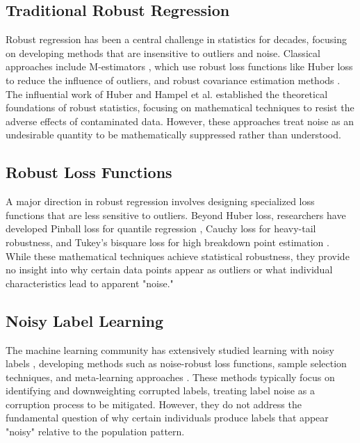 \documentclass[conference]{IEEEtran}
\begin{document}
\subsection{Traditional Robust Regression}
Robust regression has been a central challenge in statistics for decades, focusing on developing methods that are insensitive to outliers and noise. Classical approaches include M-estimators \cite{huber1964robust}, which use robust loss functions like Huber loss to reduce the influence of outliers, and robust covariance estimation methods \cite{rousseeuw1987robust}. The influential work of Huber \cite{huber2009robust} and Hampel et al. \cite{hampel1986robust} established the theoretical foundations of robust statistics, focusing on mathematical techniques to resist the adverse effects of contaminated data. However, these approaches treat noise as an undesirable quantity to be mathematically suppressed rather than understood.

\subsection{Robust Loss Functions}
A major direction in robust regression involves designing specialized loss functions that are less sensitive to outliers. Beyond Huber loss, researchers have developed Pinball loss for quantile regression \cite{koenker1978regression}, Cauchy loss for heavy-tail robustness, and Tukey's bisquare loss for high breakdown point estimation \cite{maronna2019robust}. While these mathematical techniques achieve statistical robustness, they provide no insight into why certain data points appear as outliers or what individual characteristics lead to apparent "noise."

\subsection{Noisy Label Learning}
The machine learning community has extensively studied learning with noisy labels \cite{natarajan2013learning}, developing methods such as noise-robust loss functions, sample selection techniques, and meta-learning approaches \cite{han2018co}. These methods typically focus on identifying and downweighting corrupted labels, treating label noise as a corruption process to be mitigated. However, they do not address the fundamental question of why certain individuals produce labels that appear "noisy" relative to the population pattern.

\end{document}
